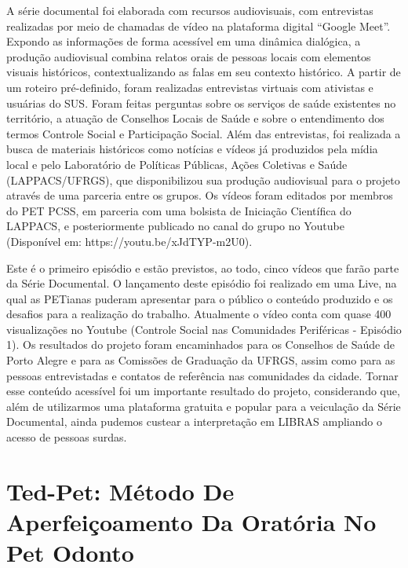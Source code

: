 A série documental foi elaborada com recursos audiovisuais, com entrevistas realizadas por meio de chamadas de vídeo na plataforma digital “Google Meet”. Expondo as informações de forma acessível em uma dinâmica dialógica, a produção audiovisual combina relatos orais de pessoas locais com elementos visuais históricos, contextualizando as falas em seu contexto histórico. A partir de um roteiro pré-definido, foram realizadas entrevistas virtuais com ativistas e usuárias do SUS. Foram feitas perguntas sobre os serviços de saúde existentes no território, a atuação de Conselhos Locais de Saúde e sobre o entendimento dos termos Controle Social e Participação Social. Além das entrevistas, foi realizada a busca de materiais históricos como notícias e vídeos já produzidos pela mídia local e pelo Laboratório de Políticas Públicas, Ações Coletivas e Saúde (LAPPACS/UFRGS), que disponibilizou sua produção audiovisual para o projeto através de uma parceria entre os grupos. Os vídeos foram editados por membros do PET PCSS, em parceria com uma bolsista de Iniciação Científica do LAPPACS, e posteriormente publicado no canal do grupo no Youtube (Disponível em: https://youtu.be/xJdTYP-m2U0). 

Este é o primeiro episódio e estão previstos, ao todo, cinco vídeos que farão parte da Série Documental. O lançamento deste episódio foi realizado em uma Live, na qual as PETianas puderam apresentar para o público o conteúdo produzido e os desafios para a realização do trabalho. Atualmente o vídeo conta com quase 400 visualizações no Youtube (Controle Social nas Comunidades Periféricas -   Episódio 1). Os resultados do projeto foram encaminhados para os Conselhos de Saúde de Porto Alegre e para as Comissões de Graduação da UFRGS, assim como para as pessoas entrevistadas e contatos de referência nas comunidades da cidade. Tornar esse conteúdo acessível foi um importante resultado do projeto, considerando que, além de utilizarmos uma plataforma gratuita e popular para a veiculação da Série Documental, ainda pudemos custear a interpretação em LIBRAS ampliando o acesso de pessoas surdas.





\section*{Ted-Pet: Método De Aperfeiçoamento Da Oratória No Pet Odonto}

